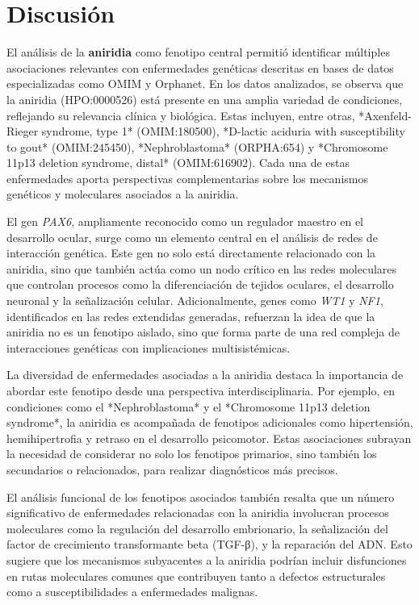 \section{Discusión}

El análisis de la \textbf{aniridia} como fenotipo central permitió identificar múltiples asociaciones relevantes con enfermedades genéticas descritas en bases de datos especializadas como OMIM y Orphanet. En los datos analizados, se observa que la aniridia (HPO:0000526) está presente en una amplia variedad de condiciones, reflejando su relevancia clínica y biológica. Estas incluyen, entre otras, *Axenfeld-Rieger syndrome, type 1* (OMIM:180500), *D-lactic aciduria with susceptibility to gout* (OMIM:245450), *Nephroblastoma* (ORPHA:654) y *Chromosome 11p13 deletion syndrome, distal* (OMIM:616902). Cada una de estas enfermedades aporta perspectivas complementarias sobre los mecanismos genéticos y moleculares asociados a la aniridia.

El gen \textit{PAX6}, ampliamente reconocido como un regulador maestro en el desarrollo ocular, surge como un elemento central en el análisis de redes de interacción genética. Este gen no solo está directamente relacionado con la aniridia, sino que también actúa como un nodo crítico en las redes moleculares que controlan procesos como la diferenciación de tejidos oculares, el desarrollo neuronal y la señalización celular. Adicionalmente, genes como \textit{WT1} y \textit{NF1}, identificados en las redes extendidas generadas, refuerzan la idea de que la aniridia no es un fenotipo aislado, sino que forma parte de una red compleja de interacciones genéticas con implicaciones multisistémicas.

La diversidad de enfermedades asociadas a la aniridia destaca la importancia de abordar este fenotipo desde una perspectiva interdisciplinaria. Por ejemplo, en condiciones como el *Nephroblastoma* y el *Chromosome 11p13 deletion syndrome*, la aniridia es acompañada de fenotipos adicionales como hipertensión, hemihipertrofia y retraso en el desarrollo psicomotor. Estas asociaciones subrayan la necesidad de considerar no solo los fenotipos primarios, sino también los secundarios o relacionados, para realizar diagnósticos más precisos.

El análisis funcional de los fenotipos asociados también resalta que un número significativo de enfermedades relacionadas con la aniridia involucran procesos moleculares como la regulación del desarrollo embrionario, la señalización del factor de crecimiento transformante beta (TGF-β), y la reparación del ADN. Esto sugiere que los mecanismos subyacentes a la aniridia podrían incluir disfunciones en rutas moleculares comunes que contribuyen tanto a defectos estructurales como a susceptibilidades a enfermedades malignas.

